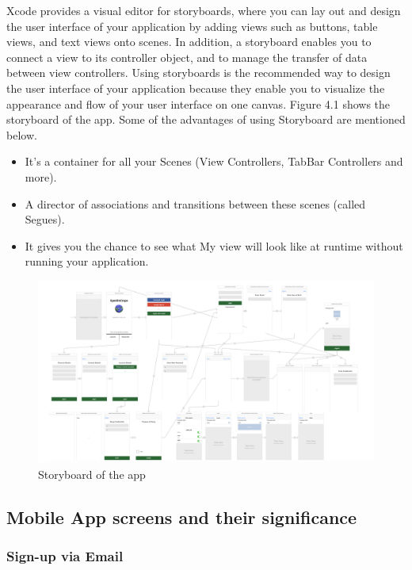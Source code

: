 Xcode provides a visual editor for storyboards, where you can lay out and design the user interface of your application by adding views such as buttons, table views, and text views onto scenes. In addition, a storyboard enables you to connect a view to its controller object, and to manage the transfer of data between view controllers. Using storyboards is the recommended way to design the user interface of your application because they enable you to visualize the appearance and flow of your user interface on one canvas. Figure 4.1 shows the storyboard of the app. Some of the advantages of using Storyboard are mentioned below.

\begin{itemize}
    \item It's a container for all your Scenes (View Controllers, TabBar Controllers and more).
    \item A director of associations and transitions between these scenes (called Segues).
    \item It gives you the chance to see what My view will look like at runtime without running your application.
\end{itemize}

\begin{figure}
    \centering
    \includegraphics[width=\linewidth]{figures/ch4/storyboard_final.png}
    \caption{\label{fig:storyboard_final} Storyboard of the app}
\end{figure}
    
\subsection{Mobile App screens and their significance}

\subsubsection{Sign-up via Email}

